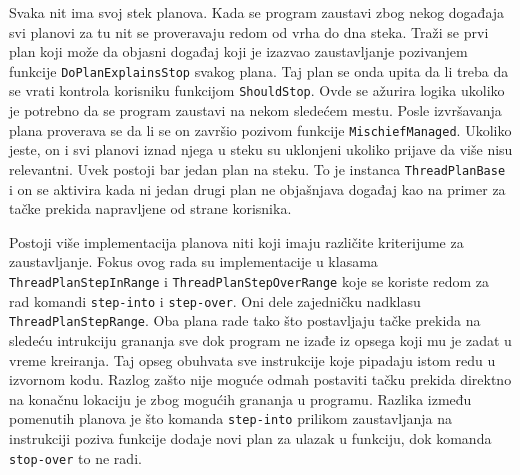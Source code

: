 \documentclass[12pt,oneside]{memoir}
\begin{document}
Svaka nit ima svoj stek planova. %
Kada se program zaustavi zbog nekog događaja svi planovi za tu nit se proveravaju redom od vrha do dna steka.
Traži se prvi plan koji može da objasni događaj koji je izazvao zaustavljanje pozivanjem funkcije \verb|DoPlanExplainsStop| svakog plana.
Taj plan se onda upita da li treba da se vrati kontrola korisniku funkcijom \verb|ShouldStop|.
Ovde se ažurira logika ukoliko je potrebno da se program zaustavi na nekom sledećem mestu.
Posle izvršavanja plana proverava se da li se on završio pozivom funkcije \verb|MischiefManaged|.
Ukoliko jeste, on i svi planovi iznad njega u steku su uklonjeni ukoliko prijave da više nisu relevantni.
Uvek postoji bar jedan plan na steku.
To je instanca \verb|ThreadPlanBase| i on se aktivira kada ni jedan drugi plan ne objašnjava događaj kao na primer za tačke prekida napravljene od strane korisnika.

Postoji više implementacija planova niti koji imaju različite kriterijume za zaustavljanje.
Fokus ovog rada su implementacije u klasama \verb|ThreadPlanStepInRange| i \verb|ThreadPlanStepOverRange| koje se koriste redom za rad komandi \verb|step-into| i \verb|step-over|.
Oni dele zajedničku nadklasu \verb|ThreadPlanStepRange|.
Oba plana rade tako što postavljaju tačke prekida na sledeću intrukciju grananja sve dok program ne izađe iz opsega koji mu je zadat u vreme kreiranja.
Taj opseg obuhvata sve instrukcije koje pipadaju istom redu u izvornom kodu.
Razlog zašto nije moguće odmah postaviti tačku prekida direktno na konačnu lokaciju je zbog mogućih grananja u programu.
Razlika između pomenutih planova je što komanda \verb|step-into| prilikom zaustavljanja na instrukciji poziva funkcije dodaje novi plan za ulazak u funkciju, dok komanda \verb|stop-over| to ne radi.
\end{document}
